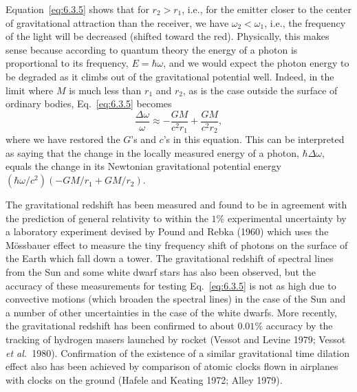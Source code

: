 Equation~\eqref{eq:6.3.5} shows that for \(r_2>r_1\), i.e., for the emitter
closer to the center of gravitational attraction than the receiver, we have
\(\omega_2<\omega_1\), i.e., the frequency of the light will be decreased
(shifted toward the red). Physically, this makes sense because according to
quantum theory the energy of a photon is proportional to its frequency,
\(E=\hbar\omega\), and we would expect the photon energy to be degraded as it
climbs out of the gravitational potential well. Indeed, in the limit where \(M\)
is much less than \(r_1\) and \(r_2\), as is the case outside the surface of
ordinary bodies, Eq.~\eqref{eq:6.3.5} becomes
\begin{equation}
  \frac{\Delta\omega}{\omega}\approx-\frac{GM}{c^2r_1}
  +\frac{GM}{c^2r_2},
  \tag{6.3.6}\label{eq:6.3.6}
\end{equation}
where we have restored the \(G\)'s and \(c\)'s in this equation. This can be
interpreted as saying that the change in the locally measured energy of a photon,
\(\hbar\Delta\omega\), equals the change in its Newtonian gravitational potential
energy \((\hbar\omega/c^2)(-GM/r_1+GM/r_2)\).

The gravitational redshift has been measured and found to be in agreement with the
prediction of general relativity to within the \(1\%\) experimental uncertainty by
a laboratory experiment devised by Pound and Rebka (1960) which uses the
M\"ossbauer effect to measure the tiny frequency shift of photons on the surface
of the Earth which fall down a tower. The gravitational redshift of spectral lines
from the Sun and some white dwarf stars has also been observed, but the accuracy of
these measurements for testing Eq.~\eqref{eq:6.3.5} is not as high due to
convective motions (which broaden the spectral lines) in the case of the Sun and a
number of other uncertainties in the case of the white dwarfs. More recently, the
gravitational redshift has been confirmed to about \(0.01\%\) accuracy by the
tracking of hydrogen masers launched by rocket (Vessot and Levine 1979; Vessot
\emph{et al.}\ 1980). Confirmation of the existence of a similar gravitational
time dilation effect also has been achieved by comparison of atomic clocks flown
in airplanes with clocks on the ground (Hafele and Keating 1972; Alley 1979).

